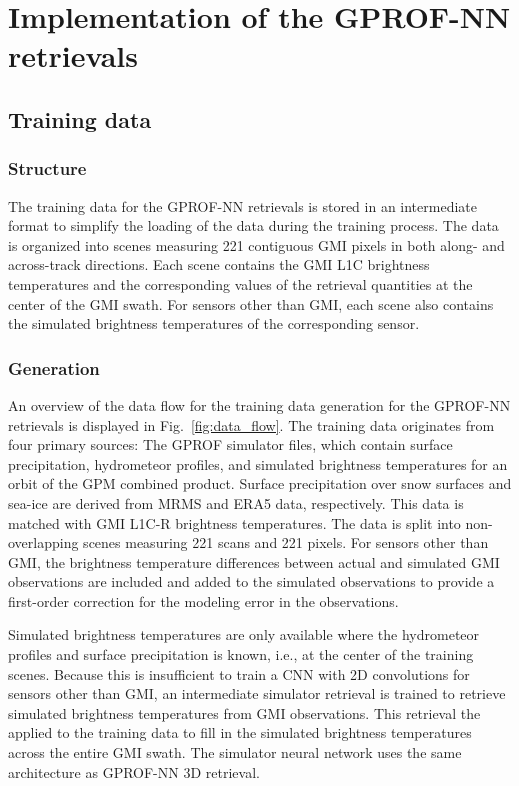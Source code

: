 \documentclass[journal abbreviation, manuscript]{copernicus}
\begin{document}
\section{Implementation of the GPROF-NN retrievals}    %

\subsection{Training data}     %
\label{sec:gprof_nn_training_data}



\subsubsection{Structure}

The training data for the GPROF-NN retrievals is stored in an intermediate format to simplify the loading of the data during the training process. The data is organized into scenes measuring 221 contiguous GMI pixels in both along- and across-track directions. Each scene contains the GMI L1C brightness temperatures and the corresponding values of the retrieval quantities at the center of the GMI swath. For sensors other than GMI, each scene also contains the simulated brightness temperatures of the corresponding sensor.

\subsubsection{Generation}
\label{app:training_data}

An overview of the data flow for the training data generation for the GPROF-NN retrievals is displayed in Fig.~\ref{fig:data_flow}. The training data originates from four primary sources: The GPROF simulator files, which contain surface precipitation, hydrometeor profiles, and simulated brightness temperatures for an orbit of the GPM combined product. Surface precipitation over snow surfaces and sea-ice are derived from MRMS and ERA5 data, respectively. This data is matched with GMI L1C-R brightness temperatures. The data is split into non-overlapping scenes measuring 221 scans and 221 pixels. For sensors other than GMI, the brightness temperature differences between actual and simulated GMI observations are included and added to the simulated observations to provide a first-order correction for the modeling error in the observations. 

Simulated brightness temperatures are only available where the hydrometeor profiles and surface precipitation is known, i.e., at the center of the training scenes. Because this is insufficient to train a CNN with 2D convolutions for sensors other than GMI, an intermediate simulator retrieval is trained to retrieve simulated brightness temperatures from GMI observations. This retrieval the applied to the training data to fill in the simulated brightness temperatures across the entire GMI swath. The simulator neural network uses the same architecture as GPROF-NN 3D retrieval.
\end{document}
